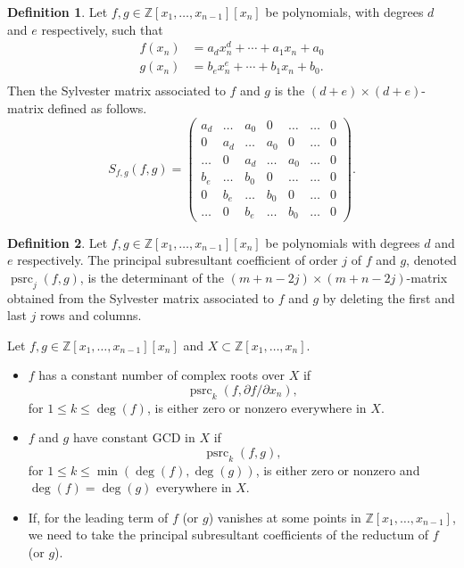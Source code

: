\documentclass[
]{book}
\providecommand{\tightlist}{%
  \setlength{\itemsep}{0pt}\setlength{\parskip}{0pt}}
\theoremstyle{definition}
\newtheorem{definition}{Definition}[chapter]
\theoremstyle{definition}
\theoremstyle{definition}
\theoremstyle{definition}
\theoremstyle{remark}
\begin{document}
\begin{definition}
Let \(f,g \in \mathbb{Z}[x_1,\ldots,x_{n-1}][x_n]\) be polynomials, with degrees \(d\) and \(e\) respectively, such that
\begin{align*}
f(x_n) &= a_d x_n^d + \cdots + a_1 x_n + a_0 \\
g(x_n) &= b_e x_n^e + \cdots + b_1 x_n + b_0. \\
\end{align*}
Then the Sylvester matrix associated to \(f\) and \(g\) is the \((d + e) \times (d + e)\)-matrix defined as follows.
\[
S_{f,g}(f,g) =
\begin{pmatrix}a_{d} & \ldots & a_{0} & 0 & \ldots & \ldots & 0\\
0 & a_{d} & \ldots & a_{0} & 0 & \ldots & 0\\
\ldots & 0 & a_{d} & \ldots & a_{0} & \ldots & 0\\
b_{e} & \ldots & b_{0} & 0 & \ldots & \ldots & 0\\
0 & b_{e} & \ldots & b_{0} & 0 & \ldots & 0\\
\ldots & 0 & b_{e} & \ldots & b_{0} & \ldots & 0
\end{pmatrix}.
\]
\end{definition}

\begin{definition}
Let \(f,g \in \mathbb{Z}[x_1,\ldots,x_{n-1}][x_n]\) be polynomials with degrees \(d\) and \(e\) respectively. The principal subresultant coefficient of order \(j\) of \(f\) and \(g\), denoted \(\operatorname{psrc}_j(f,g)\), is the determinant of the \((m + n - 2j) \times (m + n - 2j)\)-matrix obtained from the Sylvester matrix associated to \(f\) and \(g\) by deleting the first and last \(j\) rows and columns.
\end{definition}

Let \(f,g \in \mathbb{Z}[x_1,\ldots,x_{n-1}][x_n]\) and \(X \subset \mathbb{Z}[x_1,\ldots,x_n]\).

\begin{itemize}
\tightlist
\item
  \(f\) has a constant number of complex roots over \(X\) if
  \[
  \operatorname{psrc}_k(f, \partial f / \partial x_n),
  \]
  for \(1 \le k \le \deg(f)\), is either zero or nonzero everywhere in \(X\).
\item
  \(f\) and \(g\) have constant GCD in \(X\) if
  \[
  \operatorname{psrc}_k(f, g),
  \]
  for \(1 \le k \le \min(\deg(f),\deg(g))\), is either zero or nonzero and \(\deg(f) = \deg(g)\) everywhere in \(X\).
\item
  If, for the leading term of \(f\) (or \(g\)) vanishes at some points in \(\mathbb{Z}[x_1,\ldots,x_{n-1}]\), we need to take the principal subresultant coefficients of the reductum of \(f\) (or \(g\)).
  \citep[pp36]{coste2000}
\end{itemize}
\end{document}

